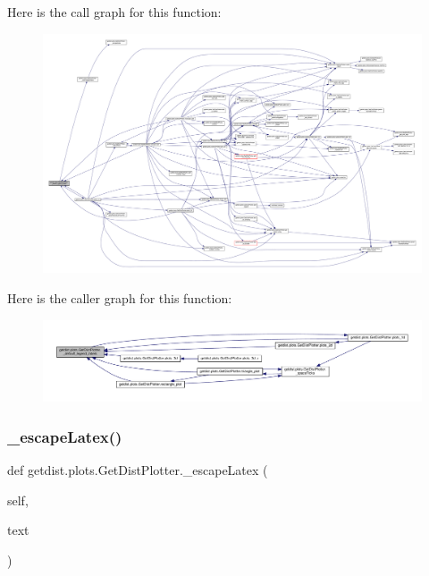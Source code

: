 Here is the call graph for this function\+:
\nopagebreak
\begin{figure}[H]
\begin{center}
\leavevmode
\includegraphics[width=350pt]{classgetdist_1_1plots_1_1GetDistPlotter_a2dd109cafefa1d1d8f3078208c79c4a6_cgraph}
\end{center}
\end{figure}
Here is the caller graph for this function\+:
\nopagebreak
\begin{figure}[H]
\begin{center}
\leavevmode
\includegraphics[width=350pt]{classgetdist_1_1plots_1_1GetDistPlotter_a2dd109cafefa1d1d8f3078208c79c4a6_icgraph}
\end{center}
\end{figure}
\mbox{\label{classgetdist_1_1plots_1_1GetDistPlotter_a1fb43f7fb0857fd242270c3b67b30eb4}} 
\subsubsection{\texorpdfstring{\+\_\+escape\+Latex()}{\_escapeLatex()}}
{\footnotesize\ttfamily def getdist.\+plots.\+Get\+Dist\+Plotter.\+\_\+escape\+Latex (\begin{DoxyParamCaption}\item[{}]{self,  }\item[{}]{text }\end{DoxyParamCaption})\hspace{0.3cm}{\ttfamily [private]}}



